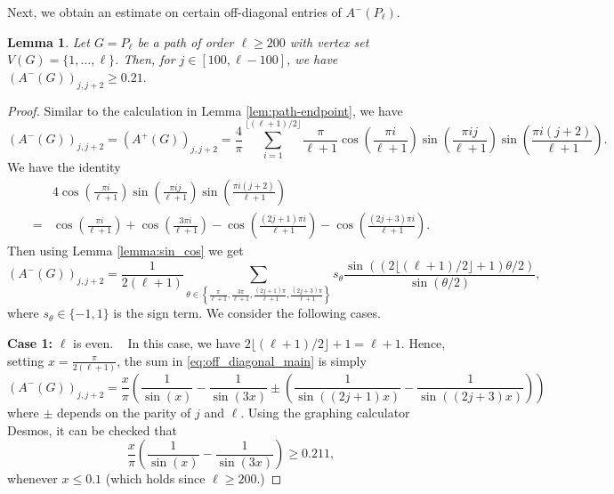 \documentclass{article}
\newtheorem{lemma}{Lemma}[section]
\begin{document}
Next, we obtain an estimate on certain off-diagonal entries of $A^-(P_{\ell})$. 

\begin{lemma}\label{lem:path-off-diagonal}
Let $G = P_\ell$ be a path of order $\ell \geq 200$ with vertex set $V(G)=\{1,\ldots, \ell\}$. Then, for $j \in [100, \ell - 100]$, we have $(A^-(G))_{j, j + 2} \geq 0.21.$
\end{lemma}

\begin{proof}
Similar to the calculation in Lemma \ref{lem:path-endpoint}, we have
    \[(A^-(G))_{j, j + 2} = (A^+(G))_{j, j + 2} = \frac{4}{\pi} \sum_{i = 1}^{\lfloor (\ell + 1) / 2 \rfloor} \frac{\pi}{\ell + 1} \cos \left(\frac{\pi i }{\ell + 1}\right) \sin \left(\frac{\pi i j}{\ell + 1}\right) \sin \left(\frac{\pi i (j + 2)}{\ell + 1}\right).\]
We have the identity
    \begin{align*}
    &4\cos \left(\frac{\pi i }{\ell + 1}\right) \sin \left(\frac{\pi i j}{\ell + 1}\right) \sin \left(\frac{\pi i (j + 2)}{\ell + 1}\right) \\
    =&  \cos\left(\frac{\pi i }{\ell + 1}\right) + \cos\left(\frac{3\pi i }{\ell + 1}\right) - \cos\left(\frac{(2j + 1)\pi i }{\ell + 1}\right) - \cos\left(\frac{(2j + 3)\pi i }{\ell + 1}\right).    
    \end{align*}
Then using Lemma \ref{lemma:sin_cos} we get
\begin{equation}\label{eq:off_diagonal_main}
    (A^-(G))_{j, j + 2} = \frac{1}{2(\ell + 1)}\sum_{\theta \in \left\{\frac{\pi}{\ell + 1}, \frac{3\pi}{\ell + 1}, \frac{(2j + 1)\pi }{\ell + 1}, \frac{(2j + 3)\pi }{\ell + 1}\right\}} s_\theta\frac{\sin((2 \lfloor (\ell + 1) / 2 \rfloor + 1) \theta / 2)}{\sin(\theta / 2)},
\end{equation}
where $s_{\theta} \in \{-1, 1\}$ is the sign term. We consider the following cases.

\textbf{Case 1:} $\ell$ is even. ~ In this case, we have $2 \lfloor (\ell + 1) / 2 \rfloor + 1 = \ell + 1.$ Hence, setting $x = \frac{\pi}{2(\ell + 1)}$, the sum in \eqref{eq:off_diagonal_main} is simply
    $$(A^-(G))_{j, j + 2} = \frac{x}{\pi} \left(\frac{1}{\sin(x)} - \frac{1}{\sin(3x)} \pm \left(\frac{1}{\sin((2j + 1) x)} - \frac{1}{\sin((2j + 3) x)}\right)\right)$$
where $\pm$ depends on the parity of $j$ and $\ell$. Using the graphing calculator Desmos, it can be checked that
   \begin{equation}\label{eq:off_diagonal_1}
       \frac{x}{\pi}\left( \frac{1}{\sin(x)} - \frac{1}{\sin(3x)}\right)\ge 0.211, 
   \end{equation}
whenever $x\le 0.1$ (which holds since $\ell\ge 200$.)


\end{proof}
\end{document}
